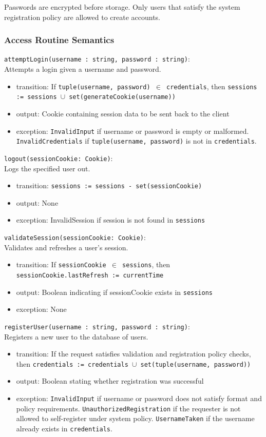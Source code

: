\documentclass[12pt, titlepage]{article}
\begin{document}
Passwords are encrypted before storage.
Only users that satisfy the system registration policy are allowed to create accounts.

\subsubsection{Access Routine Semantics}

\noindent \texttt{attemptLogin(username : string, password : string)}: \\
Attempts a login given a username and password.
\begin{itemize}
\item transition: If \texttt{tuple(username, password) $\in$ credentials}, then \texttt{sessions := sessions $\cup$ set(generateCookie(username))}
\item output: Cookie containing session data to be sent back to the client
\item exception: \texttt{InvalidInput} if username or password is empty or malformed. \texttt{InvalidCredentials} if \texttt{tuple(username, password)} is not in \texttt{credentials}.
\end{itemize}

\noindent \texttt{logout(sessionCookie: Cookie)}: \\
Logs the specified user out.
\begin{itemize}
\item transition: \texttt{sessions := sessions - set(sessionCookie)}
\item output: None
\item exception: InvalidSession if session is not found in \texttt{sessions}
\end{itemize}

\noindent \texttt{validateSession(sessionCookie: Cookie)}: \\
Validates and refreshes a user's session.
\begin{itemize}
\item transition: If \texttt{sessionCookie $\in$ sessions}, then \texttt{sessionCookie.lastRefresh := currentTime}
\item output: Boolean indicating if sessionCookie exists in \texttt{sessions}
\item exception: None
\end{itemize}

\noindent \texttt{registerUser(username : string, password : string)}: \\
Registers a new user to the database of users.
\begin{itemize}
\item transition: If the request satisfies validation and registration policy checks, then \texttt{credentials := credentials $\cup$ set(tuple(username, password))}
\item output: Boolean stating whether registration was successful
\item exception: \texttt{InvalidInput} if username or password does not satisfy format and policy requirements. \texttt{UnauthorizedRegistration} if the requester is not allowed to self-register under system policy. \texttt{UsernameTaken} if the username already exists in \texttt{credentials}.
\end{itemize}
\end{document}
